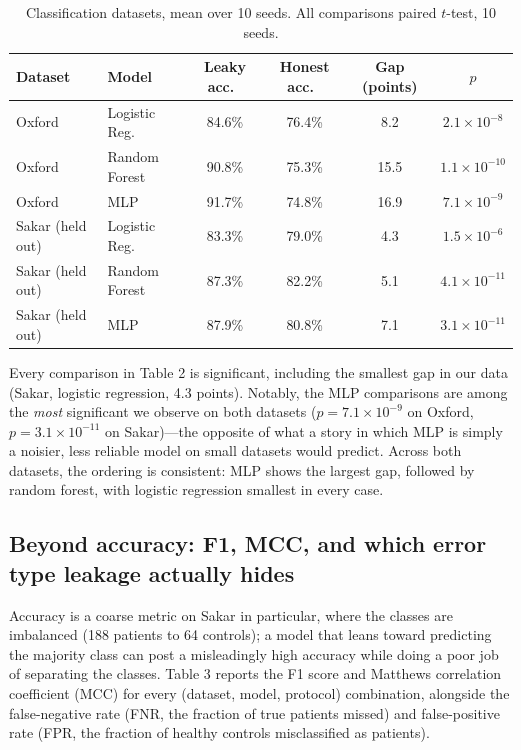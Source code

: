 \documentclass[11pt]{article}
\begin{document}
\begin{table}[h]
\centering
\caption{Classification datasets, mean over 10 seeds. All comparisons paired $t$-test, 10 seeds.}
\begin{tabular}{llcccc}
\toprule
Dataset & Model & Leaky acc.\ & Honest acc.\ & Gap (points) & $p$ \\
\midrule
Oxford & Logistic Reg.\ & 84.6\% & 76.4\% & 8.2 & $2.1\times10^{-8}$ \\
Oxford & Random Forest & 90.8\% & 75.3\% & 15.5 & $1.1\times10^{-10}$ \\
Oxford & MLP & 91.7\% & 74.8\% & 16.9 & $7.1\times10^{-9}$ \\
Sakar (held out) & Logistic Reg.\ & 83.3\% & 79.0\% & 4.3 & $1.5\times10^{-6}$ \\
Sakar (held out) & Random Forest & 87.3\% & 82.2\% & 5.1 & $4.1\times10^{-11}$ \\
Sakar (held out) & MLP & 87.9\% & 80.8\% & 7.1 & $3.1\times10^{-11}$ \\
\bottomrule
\end{tabular}
\end{table}

Every comparison in Table 2 is significant, including the smallest gap in our data (Sakar, logistic regression, 4.3 points). Notably, the MLP comparisons are among the \emph{most} significant we observe on both datasets ($p=7.1\times10^{-9}$ on Oxford, $p=3.1\times10^{-11}$ on Sakar)---the opposite of what a story in which MLP is simply a noisier, less reliable model on small datasets would predict. Across both datasets, the ordering is consistent: MLP shows the largest gap, followed by random forest, with logistic regression smallest in every case.

\subsection{Beyond accuracy: F1, MCC, and which error type leakage actually hides}
Accuracy is a coarse metric on Sakar in particular, where the classes are imbalanced (188 patients to 64 controls); a model that leans toward predicting the majority class can post a misleadingly high accuracy while doing a poor job of separating the classes. Table 3 reports the F1 score and Matthews correlation coefficient (MCC) for every (dataset, model, protocol) combination, alongside the false-negative rate (FNR, the fraction of true patients missed) and false-positive rate (FPR, the fraction of healthy controls misclassified as patients).
\end{document}
